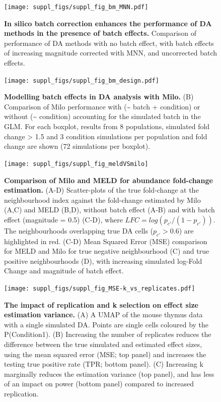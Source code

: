 \documentclass[
]{article}
\begin{document}
\begin{figure}
\centering
\texttt{[image: suppl\_figs/suppl\_fig\_bm\_MNN.pdf]}
\caption{\label{fig:sup-fig-bm-mnn}\textbf{In silico batch correction enhances the performance of DA methods in the presence of batch effects.} Comparison of performance of DA methods with no batch effect, with batch effects of increasing magnitude corrected with MNN, and uncorrected batch effects.}
\end{figure}



\begin{figure}
\centering
\texttt{[image: suppl\_figs/suppl\_fig\_bm\_design.pdf]}
\caption{\label{fig:sup-fig-bm-design}\textbf{Modelling batch effects in DA analysis with Milo.} (B) Comparison of Milo performance with (\textasciitilde{} batch + condition) or without (\textasciitilde{} condition) accounting for the simulated batch in the GLM. For each boxplot, results from 8 populations, simulated fold change \textgreater{} 1.5 and 3 condition simulations per population and fold change are shown (72 simulations per boxplot).}
\end{figure}



\begin{figure}
\texttt{[image: suppl\_figs/suppl\_fig\_meldVSmilo]} \caption{\textbf{Comparison of Milo and MELD for abundance fold-change estimation.} (A-D) Scatter-plots of the true fold-change at the neighbourhood index against the fold-change estimated by Milo (A,C) and MELD (B,D), without batch effect (A-B) and with batch effect (magnitude = 0.5) (C-D), where \(LFC = log(p_{c'}/(1 - p_{c'}))\). The neighbourhoods overlapping true DA cells (\(p_{c'}>0.6\)) are highlighted in red. (C-D) Mean Squared Error (MSE) comparison for MELD and Milo for true negative neighbourhood (C) and true positive neighbourhoods (D), with increasing simulated log-Fold Change and magnitude of batch effect.}\label{fig:sup-fig-bm-meld}
\end{figure}



\begin{figure}
\centering
\texttt{[image: suppl\_figs/suppl\_fig\_MSE-k\_vs\_replicates.pdf]}
\caption{\label{fig:sup-fig-msek}\textbf{The impact of replication and k selection on effect size estimation variance.} (A) A UMAP of the mouse thymus data with a single simulated DA. Points are single cells coloured by the P(Condition1). (B) Increasing the number of replicates reduces the difference between the true simulated and estimated effect sizes, using the mean squared error (MSE; top panel) and increases the testing true positive rate (TPR; bottom panel). (C) Increasing k marginally reduces the estimation variance (top panel), and has less of an impact on power (bottom panel) compared to increased replication.}
\end{figure}
\end{document}
